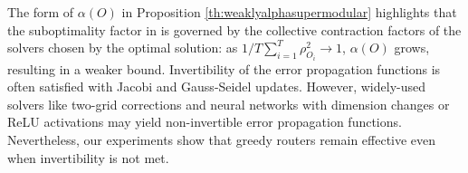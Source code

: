 \documentclass{article} %
\begin{document}
The form of $\alpha(O)$ in Proposition \ref{th:weaklyalphasupermodular} highlights that the suboptimality factor in  is governed by the collective contraction factors of the solvers chosen by the optimal solution: as $1/T\sum_{i = 1}^{T} \rho_{O_i}^2 \to 1$, $\alpha(O)$ grows, resulting in a weaker bound. 
Invertibility of the error propagation functions is often satisfied with Jacobi and Gauss-Seidel updates. However, widely-used solvers like two-grid corrections and neural networks with dimension changes or ReLU activations may yield non-invertible error propagation functions. Nevertheless, our experiments show that greedy routers remain effective even when invertibility is not met. 


\end{document}
